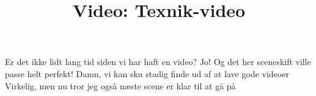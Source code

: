 \documentclass[a4paper,11pt]{article}
\title{Video: Texnik-video}
\begin{document}
\maketitle

\begin{sketch}
 Er det ikke lidt lang tid siden vi har haft en video?
 Jo! Og det her sceneskift ville passe helt perfekt!
 Damn, vi kan sku stadig finde ud af at lave gode videoer
 Virkelig, men nu tror jeg også næste scene er klar til at gå på
\end{sketch}
\end{document}
